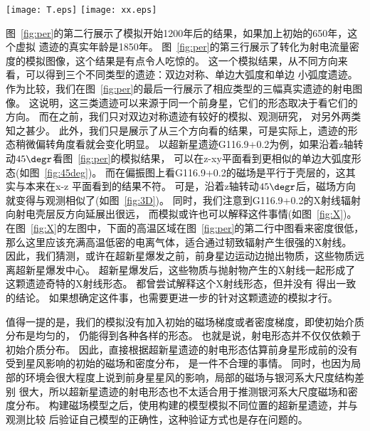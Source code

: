 \begin{figure*}
    \centering
    \texttt{[image: T.eps]}
    \texttt{[image: xx.eps]}
    \caption{\textit{左图:}x-z平面的相对温度分布。\textit{右图:} ASCA (Advanced Satellite for
    Cosmology and Astrophysics)望远镜观测到的G116.9+0.2的X图像G116.9+0.2，外加CGPS
     (Canadian Galactic Plane Survey)巡天的射电图像等高线\citep{Pannuti2010}。}
\label{fig:X}
\end{figure*}

图~\ref{fig:per}的第二行展示了模拟开始1200年后的结果，如果加上初始的650年，这个虚拟
遗迹的真实年龄是1850年。
图~\ref{fig:per}的第三行展示了转化为射电流量密度的模拟图像，这个结果是有点令人吃惊的。
这一个模拟结果，从不同方向来看，可以得到三个不同类型的遗迹：双边对称、单边大弧度和单边
小弧度遗迹。
作为比较，我们在图~\ref{fig:per}的最后一行展示了相应类型的三幅真实遗迹的射电图像。
这说明，这三类遗迹可以来源于同一个前身星，它们的形态取决于看它们的方向。
而在之前，我们只对双边对称遗迹有较好的模拟、观测研究\citep{Gaensler1999,Petruk2009a}，
对另外两类知之甚少。
此外，我们只是展示了从三个方向看的结果，可是实际上，遗迹的形态稍微偏转角度看就会变化明显。
以超新星遗迹G116.9+0.2为例，如果沿着z轴转动$45\degr$看图~\ref{fig:per}的模拟结果，
可以在z-xy平面看到更相似的单边大弧度形态(如图~\ref{fig:45deg})。
而在偏振图上看G116.9+0.2的磁场是平行于壳层的\citep{Sun2011}，这其实与本来在x-z
平面看到的结果不符。
可是，沿着z轴转动$45\degr$后，磁场方向就变得与观测相似了(如图~\ref{fig:3D})。
同时，我们注意到G116.9+0.2的X射线辐射向射电壳层反方向延展出很远\citep{Pannuti2010}，
而模拟或许也可以解释这件事情(如图~\ref{fig:X})。
在图~\ref{fig:X}的左图中，下面的高温区域在图~\ref{fig:per}的第二行中图看来密度很低，
那么这里应该充满高温低密的电离气体，适合通过韧致辐射产生很强的X射线。
因此，我们猜测，或许在超新星爆发之前，前身星边运动边抛出物质，这些物质远离超新星爆发中心。
超新星爆发后，这些物质与抛射物产生的X射线一起形成了这颗遗迹奇特的X射线形态。
\citet{Craig1997,Yar-Uyaniker2004,West2016}都曾尝试解释这个X射线形态，但并没有
得出一致的结论。
如果想确定这件事，也需要更进一步的针对这颗遗迹的模拟才行。

值得一提的是，我们的模拟没有加入初始的磁场梯度或者密度梯度，即使初始介质分布是均匀的，
仍能得到各种各样的形态。
也就是说，射电形态并不仅仅依赖于初始介质分布。
因此，直接根据超新星遗迹的射电形态估算前身星形成前的没有受到星风影响的初始的磁场和密度分布，
是一件不合理的事情。
同时，也因为局部的环境会很大程度上说到前身星星风的影响，局部的磁场与银河系大尺度结构差别
很大，所以超新星遗迹的射电形态也不太适合用于推测银河系大尺度磁场和密度分布。
\citet{West2016}构建磁场模型之后，使用构建的模型模拟不同位置的超新星遗迹，并与观测比较
后验证自己模型的正确性，这种验证方式也是存在问题的。


